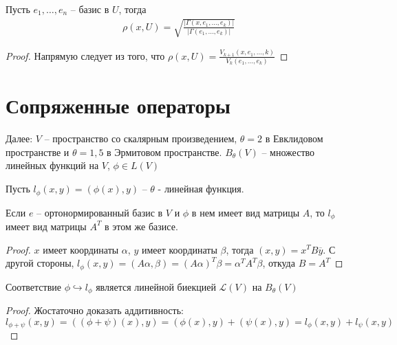 \begin{corollary}
    Пусть $e_1, \dots, e_n$ -- базис в $U$, тогда 
    \begin{gather*}
        \rho(x, U) = \sqrt{\frac{|\Gamma (x, e_1, \dots, e_k)|}{|\Gamma (e_1, \dots, e_k)|}}
    \end{gather*}
\end{corollary}

\begin{proof}
    Напрямую следует из того, что $\rho(x, U) = \frac{V_{k + 1}(x, e_1, \dots, k)}{V_k(e_1, \dots, e_k)}$
\end{proof}

\section{Сопряженные операторы}
\begin{note}
    Далее: $V$ -- пространство со скалярным произведением, $\theta = 2$ в Евклидовом пространстве и $\theta = 1,5$ в Эрмитовом пространстве. $B_{\theta}(V)$ -- множество линейных функций на $V$, $\phi \in L (V)$
\end{note}

\begin{definition}
    Пусть $l_{\phi}(x, y) = (\phi(x), y)$ -- $\theta$ - линейная функция.
\end{definition}

\begin{proposition}
    \label{pr 12.3}
    Если $e$ -- ортонормированный базис в $V$ и $\phi$ в нем имеет вид матрицы $A$, то $l_{\phi}$ имеет вид матрицы $A^T$ в этом же базисе.
\end{proposition}

\begin{proof}
    $x$ имеет координаты $\alpha$, $y$ имеет координаты $\beta$, тогда $(x, y) = x^T B \overline{y}$. С другой стороны, $l_{\phi}(x, y) = (A \alpha, \beta) = (A \alpha)^T \beta = \alpha ^T A^T \beta$, откуда $B = A^T$
\end{proof}

\begin{corollary}
    Соответствие $\phi \hookrightarrow l_{\phi}$ является линейной биекцией $\mathcal{L}(V)$ на $B_{\theta}(V)$
\end{corollary}

\begin{proof}
    Жостаточно доказать аддитивность: $l_{\phi + \psi} (x, y) = ((\phi + \psi) (x), y) = (\phi(x), y) + (\psi(x), y) = l_{\phi}(x, y) + l_{\psi}(x, y)$ 
\end{proof}

